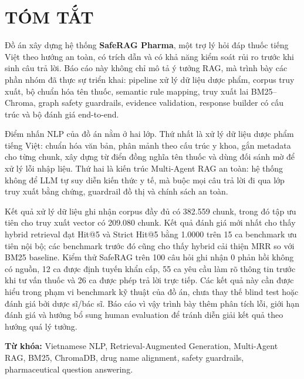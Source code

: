 \chapter*{TÓM TẮT}

Đồ án xây dựng hệ thống \textbf{SafeRAG Pharma}, một trợ lý hỏi đáp thuốc tiếng Việt theo hướng an toàn, có trích dẫn và có khả năng kiểm soát rủi ro trước khi sinh câu trả lời. Báo cáo này không chỉ mô tả ý tưởng RAG, mà trình bày các phần nhóm đã thực sự triển khai: pipeline xử lý dữ liệu dược phẩm, corpus truy xuất, bộ chuẩn hóa tên thuốc, semantic rule mapping, truy xuất lai BM25--Chroma, graph safety guardrails, evidence validation, response builder có cấu trúc và bộ đánh giá end-to-end.

Điểm nhấn NLP của đồ án nằm ở hai lớp. Thứ nhất là xử lý dữ liệu dược phẩm tiếng Việt: chuẩn hóa văn bản, phân mảnh theo cấu trúc y khoa, gắn metadata cho từng chunk, xây dựng từ điển đồng nghĩa tên thuốc và dùng đối sánh mờ để xử lý lỗi nhập liệu. Thứ hai là kiến trúc Multi-Agent RAG an toàn: hệ thống không để LLM tự suy diễn kiến thức y tế, mà buộc mọi câu trả lời đi qua lớp truy xuất bằng chứng, guardrail đồ thị và chính sách an toàn.

Kết quả xử lý dữ liệu ghi nhận corpus đầy đủ có 382.559 chunk, trong đó tập ưu tiên cho truy xuất vector có 209.080 chunk. Kết quả đánh giá mới nhất cho thấy hybrid retrieval đạt Hit@5 và Strict Hit@5 bằng 1.0000 trên 15 ca benchmark ưu tiên nội bộ; các benchmark trước đó cũng cho thấy hybrid cải thiện MRR so với BM25 baseline. Kiểm thử SafeRAG trên 100 câu hỏi ghi nhận 0 phản hồi không có nguồn, 12 ca được định tuyến khẩn cấp, 55 ca yêu cầu làm rõ thông tin trước khi tư vấn thuốc và 26 ca được phép trả lời trực tiếp. Các kết quả này cần được hiểu trong phạm vi benchmark kỹ thuật của đồ án, chưa thay thế blind test hoặc đánh giá bởi dược sĩ/bác sĩ. Báo cáo vì vậy trình bày thêm phân tích lỗi, giới hạn đánh giá và hướng bổ sung human evaluation để tránh diễn giải kết quả theo hướng quá lý tưởng.

\textbf{Từ khóa:} Vietnamese NLP, Retrieval-Augmented Generation, Multi-Agent RAG, BM25, ChromaDB, drug name alignment, safety guardrails, pharmaceutical question answering.
